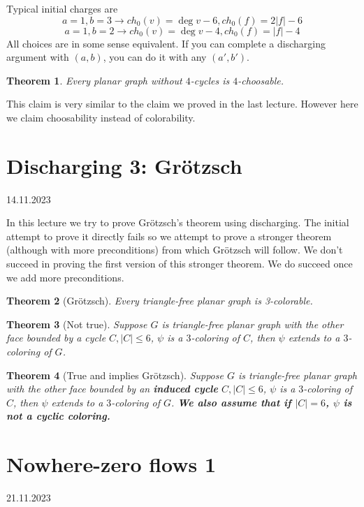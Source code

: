 \documentclass{article}
\newtheorem*{theorem}{Theorem}
\begin{document}
\noindent
Typical initial charges are
$$a = 1, b = 3 \rightarrow ch_0(v) = \deg v  - 6, ch_0(f) = 2|f|-6$$
$$a = 1, b = 2 \rightarrow ch_0(v) = \deg v - 4, ch_0(f) = |f| - 4$$
All choices are in some sense equivalent. If you can complete a discharging
argument with $(a, b)$, you can do it with any $(a', b')$.

\begin{theorem}
	Every planar graph without $4$-cycles is $4$-choosable.
\end{theorem}

\noindent
This claim is very similar to the claim we proved in the last
lecture. However here we claim choosability instead of colorability.


\newpage
\section{Discharging 3: Grötzsch} %
14.11.2023

\noindent
In this lecture we try to prove Grötzsch's theorem using discharging. The
initial attempt to prove it directly fails so we attempt to prove a stronger
theorem (although with more preconditions) from which Grötzsch will follow.
We don't succeed in proving the first version of this stronger theorem. We do
succeed once we add more preconditions.

\begin{theorem}[Grötzsch]
	Every triangle-free planar graph is 3-colorable.
\end{theorem}

\begin{theorem}[Not true]
	Suppose $G$ is triangle-free planar graph with the other face bounded
	by a cycle $C, |C| \le 6$, $\psi$ is a $3$-coloring of $C$, then $\psi$
	extends to a $3$-coloring of $G$.
\end{theorem}

\begin{theorem}[True and implies Grötzsch]
	Suppose $G$ is triangle-free planar graph with the other face bounded
	by an \textbf{induced cycle} $C, |C| \le 6$, $\psi$ is a $3$-coloring
	of $C$, then $\psi$ extends to a $3$-coloring of $G$.
	\textbf{We also assume that if $|C| = 6$, $\psi$ is not a cyclic
	coloring.}
\end{theorem}


\newpage
\section{Nowhere-zero flows 1} %
21.11.2023
\end{document}
